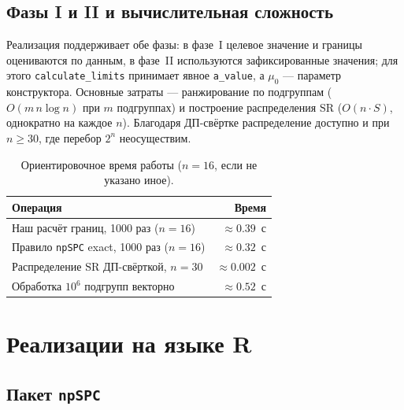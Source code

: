\documentclass[11pt,a4paper]{article}
\newcommand{\SR}{\mathrm{SR}}
\begin{document}
\subsection{Фазы I и II и вычислительная сложность}
\label{sec:impl-complexity}

Реализация поддерживает обе фазы: в фазе~I целевое значение и границы
оцениваются по данным, в фазе~II используются зафиксированные значения; для
этого \texttt{calculate\_limits} принимает явное \texttt{a\_value}, а
$\mu_0$ --- параметр конструктора. Основные затраты --- ранжирование по
подгруппам ($O(m\,n\log n)$ при $m$ подгруппах) и построение
распределения $\SR$ ($O(n\cdot S)$, однократно на каждое $n$). Благодаря
ДП-свёртке распределение доступно и при $n\ge30$, где перебор $2^n$
неосуществим.

\begin{table}[htbp]\centering
\caption{Ориентировочное время работы ($n=16$, если не указано иное).}
\label{tab:timing}
\small
\begin{tabular}{@{}l r@{}}
\toprule
Операция & Время \\
\midrule
Наш расчёт границ, 1000 раз ($n=16$) & $\approx0.39$~с \\
Правило \texttt{npSPC} exact, 1000 раз ($n=16$) & $\approx0.32$~с \\
Распределение $\SR$ ДП-свёрткой, $n=30$ & $\approx0.002$~с \\
Обработка $10^6$ подгрупп векторно & $\approx0.52$~с \\
\bottomrule
\end{tabular}
\normalsize
\end{table}

\section{Реализации на языке R}
\label{sec:r}

\subsection{Пакет \texttt{npSPC}}
\label{sec:npspc}
\end{document}
